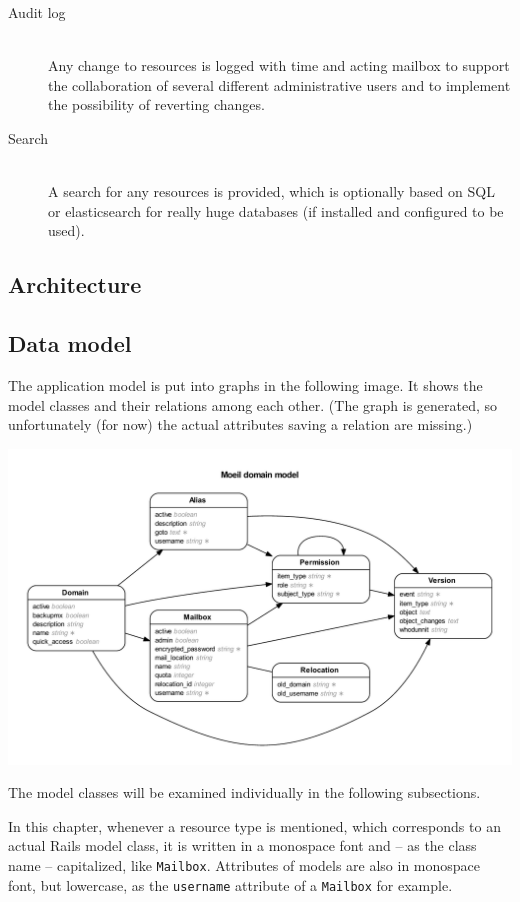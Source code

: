 \documentclass[12pt,a4paper]{scrartcl}
\begin{document}
\begin{description}
				\item[\rm Audit log]\ \\
					Any change to resources is logged with time and acting
					mailbox to support the collaboration of several different
					administrative users and to implement the possibility of
					reverting changes.

				\item[\rm Search]\ \\
					A search for any resources is provided, which is optionally
					based on \ac{SQL} or elasticsearch for really huge
					databases (if installed and configured to be used).
			\end{description}

		\subsection*{Architecture}

		\subsection*{Data model}

			The application model is put into graphs in the following image. It
			shows the model classes and their relations among each other. (The
			graph is generated, so unfortunately (for now) the actual attributes
			saving a relation are missing.)

			\includegraphics[width=\textwidth]{images/erd.pdf}

			The model classes will be examined individually in the following
			subsections.
			\s

			In this chapter, whenever a resource type is mentioned, which
			corresponds to an actual \ac{Rails} model class, it is written in a
			monospace font and -- as the class name -- capitalized, like
			\texttt{Mailbox}. Attributes of models are also in monospace font,
			but lowercase, as the \texttt{username} attribute of a
			\texttt{Mailbox} for example.
\end{document}
